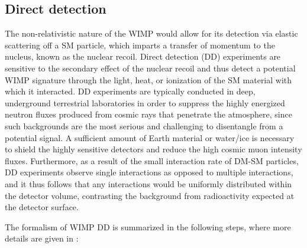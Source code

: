 \subsection{Direct detection}
\label{subsec:DD}

The non-relativistic nature of the WIMP would allow for its detection via elastic scattering off a SM particle, which imparts a transfer of momentum to the nucleus, known as the nuclear recoil. Direct detection (DD) experiments are sensitive to the secondary effect of the nuclear recoil and thus detect a potential WIMP signature through the light, heat, or ionization of the SM material with which it interacted. DD experiments are typically conducted in deep, underground terrestrial laboratories in order to suppress the highly energized neutron fluxes produced from cosmic rays that penetrate the atmosphere, since such backgrounds are the most serious and challenging to disentangle from a potential signal. A sufficient amount of Earth material or water/ice is necessary to shield the highly sensitive detectors and reduce the high cosmic muon intensity fluxes. Furthermore, as a result of the small interaction rate of DM-SM particles, DD experiments observe single interactions as opposed to multiple interactions, and it thus follows that any interactions would be uniformly distributed within the detector volume, contrasting the background from radioactivity expected at the detector surface.

The formalism of WIMP DD is summarized in the following steps, where more details are given in \cite{Jungman:1995df}:

